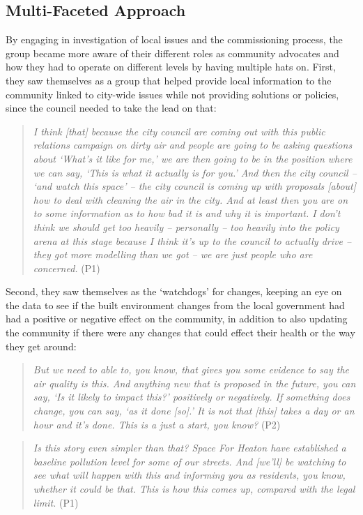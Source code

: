 \subsection{Multi-Faceted Approach}
By engaging in investigation of local issues and the commissioning process, the group became more aware of their different roles as community advocates and how they had to operate on different levels by having multiple hats on. First, they saw themselves as a group that helped provide local information to the community linked to city-wide issues while not providing solutions or policies, since the council needed to take the lead on that:
\begin{quote}
    \textit{I think [that] because the city council are coming out with this public relations campaign on dirty air and people are going to be asking questions about `What's it like for me,' we are then going to be in the position where we can say, `This is what it actually is for you.' And then the city council -- `and watch this space' -- the city council is coming up with proposals [about] how to deal with cleaning the air in the city. And at least then you are on to some information as to how bad it is and why it is important. I don't think we should get too heavily -- personally -- too heavily into the policy arena at this stage because I think it's up to the council to actually drive -- they got more modelling than we got -- we are just people who are concerned.} (P1)
\end{quote}

Second, they saw themselves as the `watchdogs' for changes, keeping an eye on the data to see if the built environment changes from the local government had had a positive or negative effect on the community, in addition to also updating the community if there were any changes that could effect their health or the way they get around:
\begin{quote}
    \textit{But we need to able to, you know, that gives you some evidence to say the air quality is this. And anything new that is proposed in the future, you can say, `Is it likely to impact this?' positively or negatively. If something does change, you can say, `as it done [so].' It is not that [this] takes a day or an hour and it's done. This is a just a start, you know?} (P2)
\end{quote}

\begin{quote}
    \textit{Is this story even simpler than that? Space For Heaton have established a baseline pollution level for some of our streets. And [we'll] be watching to see what will happen with this and informing you as residents, you know, whether it could be that. This is how this comes up, compared with the legal limit.} (P1)
\end{quote}

